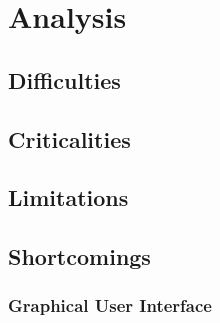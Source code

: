 \chapter{Analysis}
\label{cha:analysis}

\section{Difficulties}
\label{sec:analysis_difficulties}

\section{Criticalities}
\label{sec:analysis_criticalities}

\section{Limitations}
\label{sec:analysis_limitations}

\section{Shortcomings}
\label{sec:analysis_shortcomings}

\subsection{Graphical User Interface}
\label{subsec:analysis_shortcomings_graphical_user_interface}